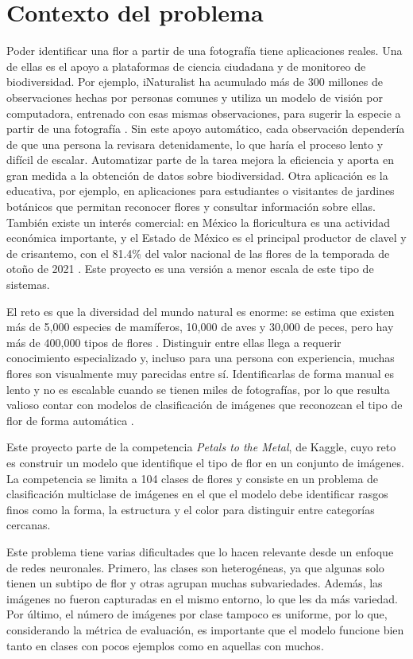 \section{Contexto del problema}

Poder identificar una flor a partir de una fotografía tiene aplicaciones reales.
Una de ellas es el apoyo a plataformas de ciencia ciudadana y de monitoreo de
biodiversidad. Por ejemplo, iNaturalist ha acumulado más de 300 millones de
observaciones hechas por personas comunes y utiliza un modelo de visión por
computadora, entrenado con esas mismas observaciones, para sugerir la especie a
partir de una fotografía \autocite{inaturalist}. Sin este apoyo automático, cada
observación dependería de que una persona la revisara detenidamente, lo que
haría el proceso lento y difícil de escalar. Automatizar parte de la tarea
mejora la eficiencia y aporta en gran medida a la obtención de datos sobre
biodiversidad. Otra aplicación es la educativa, por ejemplo, en aplicaciones
para estudiantes o visitantes de jardines botánicos que permitan reconocer
flores y consultar información sobre ellas. También existe un interés
comercial: en México la floricultura es una actividad económica importante, y
el Estado de México es el principal productor de clavel y de crisantemo, con el
81.4\% del valor nacional de las flores de la temporada de otoño de 2021
\autocite{sader2022flores}. Este proyecto es una versión a menor escala de este
tipo de sistemas.

El reto es que la diversidad del mundo natural es enorme: se estima que existen
más de 5,000 especies de mamíferos, 10,000 de aves y 30,000 de peces, pero hay
más de 400,000 tipos de flores \autocite{kagglePetalsMetal}. Distinguir entre
ellas llega a requerir conocimiento especializado y, incluso para una persona
con experiencia, muchas flores son visualmente muy parecidas entre sí.
Identificarlas de forma manual es lento y no es escalable cuando se tienen miles
de fotografías, por lo que resulta valioso contar con modelos de clasificación
de imágenes que reconozcan el tipo de flor de forma automática
\autocite{ibmWhatImage}.

Este proyecto parte de la competencia \textit{Petals to the Metal}, de Kaggle,
cuyo reto es construir un modelo que identifique el tipo de flor en un conjunto
de imágenes. La competencia se limita a 104 clases de flores y consiste en un
problema de clasificación multiclase de imágenes en el que el modelo debe
identificar rasgos finos como la forma, la estructura y el color para distinguir
entre categorías cercanas.

Este problema tiene varias dificultades que lo hacen relevante desde un enfoque
de redes neuronales. Primero, las clases son heterogéneas, ya que algunas solo
tienen un subtipo de flor y otras agrupan muchas subvariedades. Además, las
imágenes no fueron capturadas en el mismo entorno, lo que les da más variedad.
Por último, el número de imágenes por clase tampoco es uniforme, por lo que,
considerando la métrica de evaluación, es importante que el modelo funcione bien
tanto en clases con pocos ejemplos como en aquellas con muchos.
